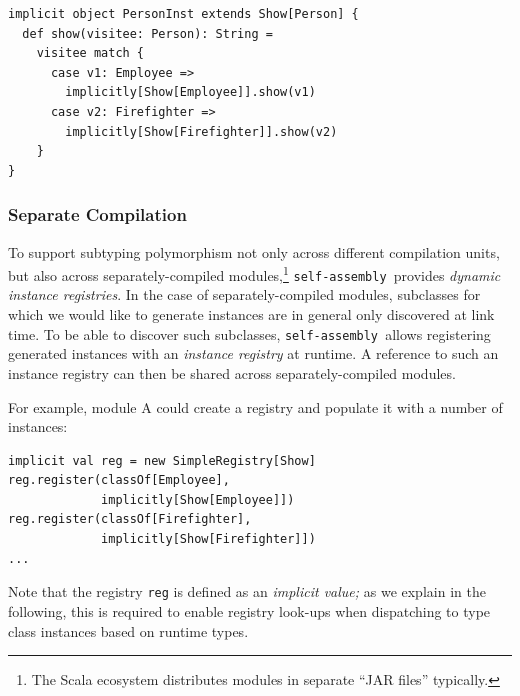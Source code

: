 \documentclass[preprint,nocopyrightspace]{sigplanconf}
\newcommand{\selfassembly}{\texttt{self-assembly~}}
\begin{document}
\begin{lstlisting}
implicit object PersonInst extends Show[Person] {
  def show(visitee: Person): String =
    visitee match {
      case v1: Employee =>
        implicitly[Show[Employee]].show(v1)
      case v2: Firefighter =>
        implicitly[Show[Firefighter]].show(v2)
    }
}
\end{lstlisting}




\subsubsection{Separate Compilation}\label{sec:oo-sub-sep}

To support subtyping polymorphism not only across different compilation units,
but also across separately-compiled modules,\footnote{The Scala ecosystem distributes modules in separate ``JAR files'' typically.}
\selfassembly provides \emph{dynamic instance registries}. In the case of
separately-compiled modules, subclasses for which we would like to generate
instances are in general only discovered at link time. To be able to discover
such subclasses, \selfassembly allows registering generated instances
with an \emph{instance registry} at runtime. A reference to such an
instance registry can then be shared across separately-compiled modules.

For example, module A could create a registry and populate it with a number of
instances:
\begin{lstlisting}
implicit val reg = new SimpleRegistry[Show]
reg.register(classOf[Employee],
             implicitly[Show[Employee]])
reg.register(classOf[Firefighter],
             implicitly[Show[Firefighter]])
...
\end{lstlisting}
\noindent
Note that the registry \verb|reg| is defined as an \emph{implicit value;} as we
explain in the following, this is required to enable registry look-ups when
dispatching to type class instances based on runtime types.
\end{document}
